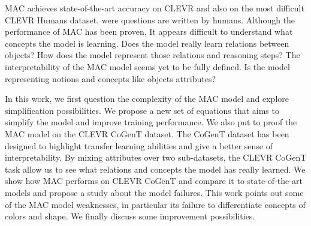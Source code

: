 MAC achieves state-of-the-art accuracy on CLEVR and also on the most difficult CLEVR Humans dataset, were questions are written by humans. 
Although the performance of MAC has been proven, It appears difficult to understand what concepts the model is learning. 
Does the model really learn relations between objects? 
How does the model represent those relations and reasoning steps? 
The interpretability of the MAC model seems yet to be fully defined.
Is the model representing notions and concepts like objects attributes?

In this work, we first question the complexity of the MAC model and explore simplification possibilities. We propose a new set of equations that aims to simplify the model and improve training performance. 
We also put to proof the MAC model on the CLEVR CoGenT dataset. The CoGenT dataset has been designed to highlight transfer learning abilities and give a better sense of interpretability. By mixing attributes over two sub-datasets, the CLEVR CoGenT task allow us to see what relations and concepts the model has really learned. We show how MAC performs on CLEVR CoGenT and compare it to state-of-the-art models and propose a study about the model failures. This work points out some of the MAC model weaknesses, in particular its failure to differentiate concepts of colors and shape. We finally discuss some improvement possibilities.
